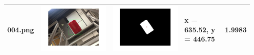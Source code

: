 \documentclass[fleqn,10pt]{SelfArx} %
\begin{document}
\begin{table}
\begin{tabular}{>{\centering\arraybackslash}M{15mm}cc>{\centering\arraybackslash}M{11mm}>{\centering\arraybackslash}M{15mm}}
\vspace{-4cm}004.png & \includegraphics[trim={3cm 2cm 3cm 2cm},clip,scale=0.28]{results/004.jpg} & \includegraphics[trim={3cm 2cm 3cm 2cm},clip,scale=0.28]{results/004s.jpg} & \vspace{-4cm} x = 635.52, y = 446.75 & \vspace{-4cm}1.9983 \\ 
\hline 

\end{tabular}
\end{table}
\end{document}
